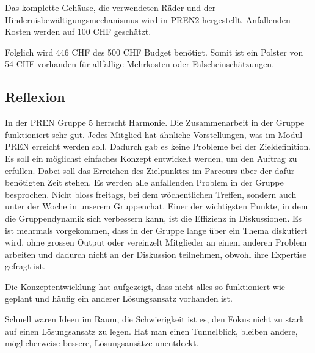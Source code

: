 \documentclass[../main.tex]{subfiles}
\begin{document}
Das komplette Gehäuse, die verwendeten Räder und der Hindernisbewältigungsmechanismus wird in PREN2 hergestellt. Anfallenden Kosten werden auf 100 CHF geschätzt.

Folglich wird 446 CHF des 500 CHF Budget benötigt. Somit ist ein Polster von 54 CHF vorhanden für allfällige Mehrkosten oder Falscheinschätzungen.

\subsection{Reflexion}

In der PREN Gruppe 5 herrscht Harmonie.
\newline
\newline
Die Zusammenarbeit in der Gruppe funktioniert sehr gut. Jedes Mitglied hat ähnliche Vorstellungen, was im Modul PREN erreicht werden soll. Dadurch gab es keine Probleme bei der Zieldefinition. Es soll ein möglichst einfaches Konzept entwickelt werden, um den Auftrag zu erfüllen. Dabei soll das Erreichen des Zielpunktes im Parcours über der dafür benötigten Zeit stehen. Es werden alle anfallenden Problem in der Gruppe besprochen. Nicht bloss freitags, bei dem wöchentlichen Treffen, sondern auch unter der Woche in unserem Gruppenchat. Einer der wichtigsten Punkte, in dem die Gruppendynamik sich verbessern kann, ist die Effizienz in Diskussionen. Es ist mehrmals vorgekommen, dass in der Gruppe lange über ein Thema diskutiert wird, ohne grossen Output oder vereinzelt Mitglieder an einem anderen Problem arbeiten und dadurch nicht an der Diskussion teilnehmen, obwohl ihre Expertise gefragt ist.

Die Konzeptentwicklung hat aufgezeigt, dass nicht alles so funktioniert wie geplant und häufig ein anderer Lösungsansatz vorhanden ist. 

Schnell waren Ideen im Raum, die Schwierigkeit ist es, den Fokus nicht zu stark auf einen Lösungsansatz zu legen. Hat man einen Tunnelblick, bleiben andere, möglicherweise bessere, Lösungsansätze unentdeckt. 
\end{document}
